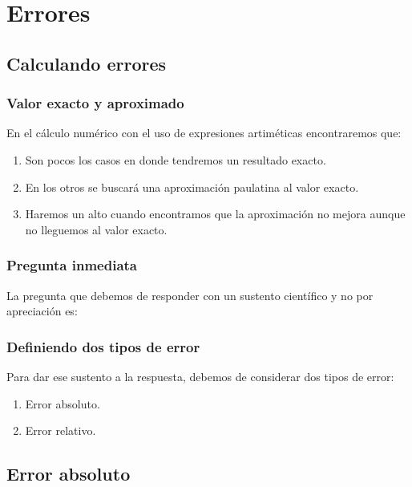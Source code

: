 \documentclass[12pt]{beamer}
\begin{document}
\section{Errores}
\subsection{Calculando errores}

\begin{frame}
\frametitle{Valor exacto y aproximado}
En el cálculo numérico con el uso de expresiones artiméticas encontraremos que:
\begin{enumerate}[<+->]
\item Son pocos los casos en donde tendremos un resultado exacto.
\item En los otros se buscará una aproximación paulatina al valor exacto.
\item Haremos un alto cuando encontramos que la aproximación no mejora aunque no lleguemos al valor exacto.
\end{enumerate}
\end{frame}
\begin{frame}
\frametitle{Pregunta inmediata}
La pregunta que debemos de responder con un sustento científico y no por apreciación es:
\pause
\begin{center}
\end{center}
\end{frame}
\begin{frame}
\frametitle{Definiendo dos tipos de error}
Para dar ese sustento a la respuesta, debemos de considerar dos tipos de error:
\begin{enumerate}[<+->]
\item Error absoluto.
\item Error relativo.
\end{enumerate}
\end{frame}

\subsection{Error absoluto}
\end{document}
